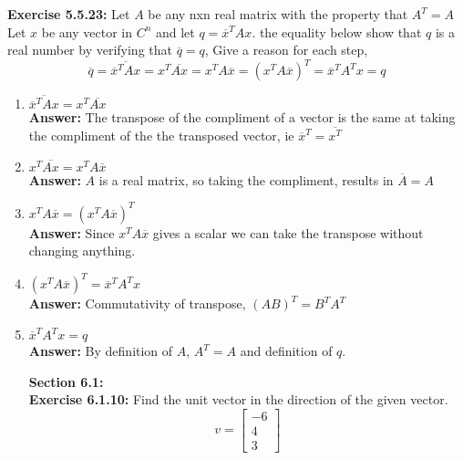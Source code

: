 \documentclass{amsart}
\begin{document}
\noindent\textbf{Exercise 5.5.23: } 
 Let $A$ be any nxn real matrix with the property that $A^T = A$ Let $x$ be any vector in $C^n$ and let $q = \overline{x}^TAx$. the equality below show that $q$ is a real number by verifying that $\overline{q} = q$, Give a reason for each step,
\begin{equation*}
\overline{q} =  \overline{\overline{x}^TAx} = x^T\overline{Ax} = x^TA\overline{x} = (x^TA\overline{x})^{T} =\overline{x}^TA^{T}x = q  
\end{equation*}
\begin{enumerate}

\item $ \overline{\overline{x}^TAx} = x^T\overline{Ax} $\\
\noindent \textbf{Answer: }The transpose of the compliment of a vector is the same at taking the compliment of the the transposed vector, ie $\overline{x}^T = \overline{x^T}$ 
\vspace{1in}

\item $ x^T\overline{Ax} = x^TA\overline{x}$\\
\noindent \textbf{Answer: } $A$ is a real matrix, so taking the compliment, results in $\overline{A} = A$
\vspace{1in}

\item $x^TA\overline{x} = (x^TA\overline{x})^{T}$\\
\noindent \textbf{Answer: } Since $x^TA\overline{x}$ gives a scalar we can take the transpose without changing anything. 
\vspace{1in}

\item$(x^TA\overline{x})^{T} =\overline{x}^TA^{T}x $\\
\noindent \textbf{Answer: } Commutativity of transpose, $(AB)^T = B^TA^T$
\vspace{1in}

\item $\overline{x}^TA^{T}x = q $\\
\noindent \textbf{Answer: } By definition of $A$, $A^T = A$  and definition of $q$.
\vspace{1in}




{\huge\textbf{Section 6.1:}}\\
\noindent\textbf{Exercise 6.1.10: } Find the unit vector in the direction of the given vector.
\begin{equation*}
v = 
\begin{bmatrix}
-6\\
4\\
3
\end{bmatrix}
\end{equation*}


\end{enumerate}
\end{document}
